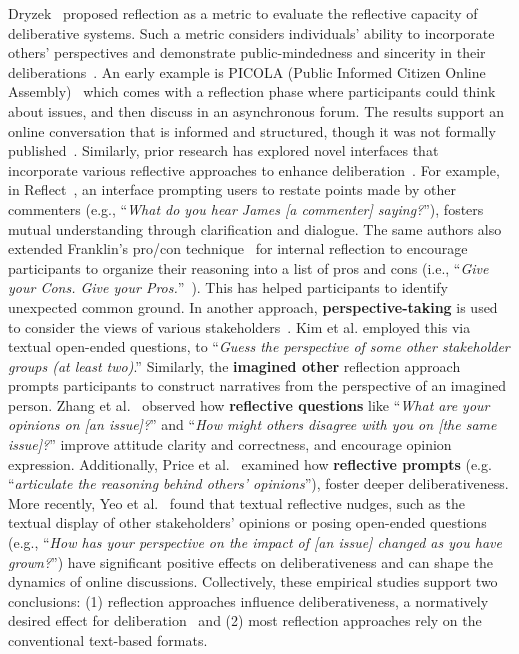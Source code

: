 Dryzek~\cite{dryzek2009democratization} proposed reflection as a metric to evaluate the reflective capacity of deliberative systems. Such a metric considers individuals' ability to incorporate others' perspectives and demonstrate public-mindedness and sincerity in their deliberations~\cite{holdo2020meta}. An early example is PICOLA (Public Informed Citizen Online Assembly)~\cite{cavalier2009deliberative} which comes with a reflection phase where participants could think about issues, and then discuss in an asynchronous forum. The results support an online conversation that is informed and structured, though it was not formally published~\cite{cavalier2009deliberative}. Similarly, prior research has explored novel interfaces that incorporate various reflective approaches to enhance deliberation~\cite{arceneaux2017taming}. For example, in Reflect~\cite{kriplean2012you}, an interface prompting users to restate points made by other commenters (e.g., ``\textit{What do you hear James [a commenter] saying?}''), fosters mutual understanding through clarification and dialogue. The same authors also extended Franklin's pro/con technique~\cite{franklin1956mr} for internal reflection to encourage participants to organize their reasoning into a list of pros and cons (i.e., ``\textit{Give your Cons. Give your Pros.}''~\cite{considerConsideritOnly, kriplean2012supporting, kriplean2011considerit}). This has helped participants to identify unexpected common ground. In another approach, \textbf{perspective-taking} is used to consider the views of various stakeholders~\cite{tuller2015seeing}. Kim et al.\cite{kim2019crowdsourcing} employed this via textual open-ended questions, to ``\textit{Guess the perspective of some other stakeholder groups (at least two)}.'' Similarly, the \textbf{imagined other} reflection approach~\cite{batson1997perspective, galinsky2000perspective} prompts participants to construct narratives from the perspective of an imagined person. Zhang et al.~\cite{zhang2021nudge} observed how \textbf{reflective questions} like ``\textit{What are your opinions on [an issue]?}'' and ``\textit{How might others disagree with you on [the same issue]?}'' improve attitude clarity and correctness, and encourage opinion expression. Additionally, Price et al.~\cite{price2002does} examined how \textbf{reflective prompts} (e.g. ``\textit{articulate the reasoning behind others' opinions}''), foster deeper deliberativeness. More recently, Yeo et al.~\cite{yeo2024help} found that textual reflective nudges, such as the textual display of other stakeholders' opinions or posing open-ended questions (e.g., ``\textit{How has your perspective on the impact of [an issue] changed as you have grown?}'') have significant positive effects on deliberativeness and can shape the dynamics of online discussions. Collectively, these empirical studies support two conclusions: (1) reflection approaches influence deliberativeness, a normatively desired effect for deliberation~\cite{bohman2000public, zhang2021nudge} and (2) most reflection approaches rely on the conventional text-based formats.


